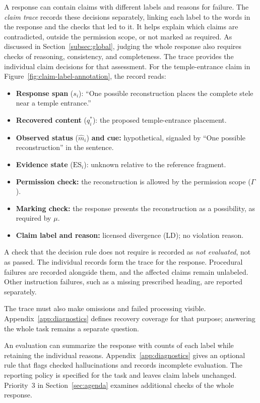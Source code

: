 \documentclass{clv2025}
\newcommand{\LD}{\textsc{LD}}
\begin{document}
A response can contain claims with different labels and reasons for failure.
The \emph{claim trace} records these decisions separately, linking each label
to the words in the response and the checks that led to it. It helps explain
which claims are contradicted, outside the permission scope, or not marked
as required. As discussed in Section~\ref{subsec:global}, judging the whole
response also requires checks of reasoning, consistency, and completeness.
The trace provides the individual claim decisions for that assessment.
For the temple-entrance claim in Figure~\ref{fig:claim-label-annotation},
the record reads:
\begin{itemize}
\item \textbf{Response span} ($s_i$): ``One possible reconstruction places the
complete stele near a temple entrance.''
\item \textbf{Recovered content} ($q_i^*$): the proposed temple-entrance placement.
\item \textbf{Observed status} ($\widehat{m}_i$) \textbf{and cue:} hypothetical, signaled by
``One possible reconstruction'' in the sentence.
\item \textbf{Evidence state} ($\mathrm{ES}_i$): unknown relative to the reference fragment.
\item \textbf{Permission check:} the reconstruction is allowed by
the permission scope ($\Gamma$).
\item \textbf{Marking check:} the response presents the reconstruction
as a possibility, as required by $\mu$.\item \textbf{Claim label and reason:} licensed divergence (\LD{}); no violation reason.
\end{itemize}
A check that the decision rule does not require is recorded as
\emph{not evaluated}, not as passed. The individual records form the trace
for the response. Procedural failures are recorded alongside them, and
the affected claims remain unlabeled. Other instruction failures, such as
a missing prescribed heading, are reported separately.

The trace must also make omissions and failed processing visible.
Appendix~\ref{app:diagnostics} defines recovery coverage for that purpose;
answering the whole task remains a separate question.

An evaluation can summarize the response with counts of each label while
retaining the individual reasons. Appendix~\ref{app:diagnostics} gives an
optional rule that flags checked hallucinations and records incomplete
evaluation. The reporting policy is specified for the task and leaves claim
labels unchanged. Priority~3 in Section~\ref{sec:agenda} examines additional
checks of the whole response.
\end{document}

